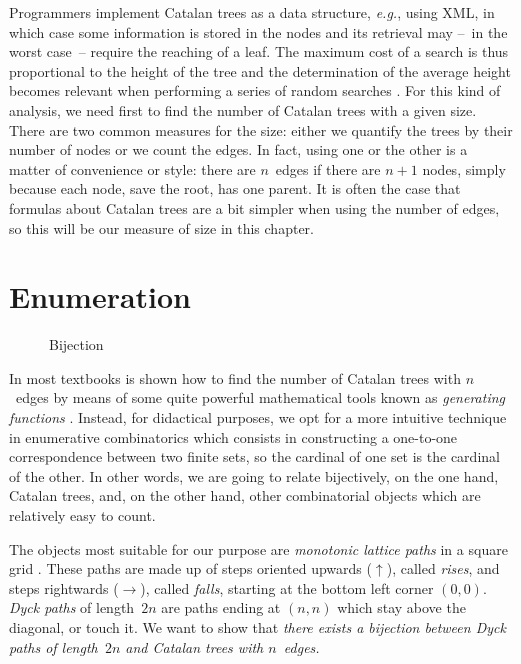 Programmers implement Catalan trees as a data structure, \emph{e.g.},
using \textsf{XML}, in which case some information is stored in the
nodes and its retrieval may --~in the worst case~-- require the
reaching of a leaf. The maximum cost of a search is thus proportional
to the height of the tree and the determination of the average height
becomes relevant when performing a series of random searches
\citep{VitterFlajolet_1990}. For this kind of analysis, we need first
to find the number of Catalan trees with a given size. There are two
common measures for the size: either we quantify the trees by their
number of nodes or we count the edges. In fact, using one or the other
is a matter of convenience or style: there are \(n\)~edges if there
are \(n+1\) nodes, simply because each node, save the root, has one
parent. It is often the case that formulas about Catalan trees are a
bit simpler when using the number of edges, so this will be our
measure of size in this chapter.

\section{Enumeration}
\label{sec:Catalan_enumeration}

%
\begin{wrapfigure}[10]{r}[0pt]{0pt}
\centering
{}
\quad
{}
\caption{Bijection\label{fig:bijection}}
\end{wrapfigure}
In most textbooks \cite[\S~5.1 \&~5.2]{SedgewickFlajolet_1996} is
shown how to find the number of Catalan trees with \(n\)~edges by
means of some quite powerful mathematical tools known as
\emph{generating functions} \cite[chap.~7]{GrahamKnuthPatashnik_1994}. Instead, for
didactical purposes, we opt for a more intuitive technique in
enumerative combinatorics which
consists in constructing a one\hyp{}to\hyp{}one correspondence between
two finite sets, so the cardinal of one set is the cardinal of the
other. In other words, we are going to relate bijectively, on the one
hand, Catalan trees, and, on the other hand, other combinatorial
objects which are relatively easy to count.

The objects most suitable for our purpose are \emph{monotonic lattice
  paths} in a square grid
\citep{Mohanty_1979,Humphreys_2010}. These paths are made up of steps
oriented upwards (\(\uparrow\)), called \emph{rises}, and steps
rightwards (\(\rightarrow\)), called \emph{falls}, starting at the
bottom left corner \((0,0)\). \emph{Dyck paths} of
length~\(2n\) are paths ending at \((n,n)\) which stay above the
diagonal, or touch it. We want to show that \emph{there exists a
  bijection between Dyck paths of length~\(2n\) and Catalan trees with
  \(n\)~edges.}

